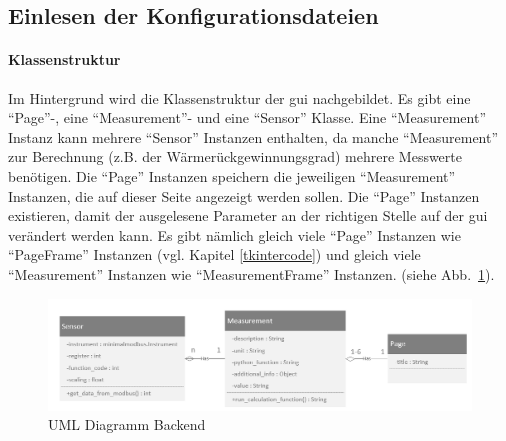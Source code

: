 \subsection{Einlesen der Konfigurationsdateien} \label{einlesen_konfigurationsdateien}
\paragraph{Klassenstruktur}
Im Hintergrund wird die Klassenstruktur der \acs{gui} nachgebildet. Es gibt eine \enquote{Page}-, eine \enquote{Measurement}- und eine \enquote{Sensor} Klasse. Eine \enquote{Measurement} Instanz kann mehrere \enquote{Sensor} Instanzen enthalten, da manche \enquote{Measurement} zur Berechnung (z.B. der Wärmerückgewinnungsgrad) mehrere Messwerte benötigen. Die \enquote{Page} Instanzen speichern die jeweiligen \enquote{Measurement} Instanzen, die auf dieser Seite angezeigt werden sollen. Die \enquote{Page} Instanzen existieren, damit der ausgelesene Parameter an der richtigen Stelle auf der \acs{gui} verändert werden kann. Es gibt nämlich gleich viele \enquote{Page} Instanzen wie \enquote{PageFrame} Instanzen (vgl. Kapitel \ref{tkintercode}) und gleich viele \enquote{Measurement} Instanzen wie \enquote{MeasurementFrame} Instanzen. (siehe Abb.~\ref{fig:uml_backend}).
\begin{figure}[ht]
	\centering
	\includegraphics[width=1.0\linewidth]{Bilder/UML_Backend}
	\caption{UML Diagramm Backend}
	\label{fig:uml_backend}
\end{figure}

